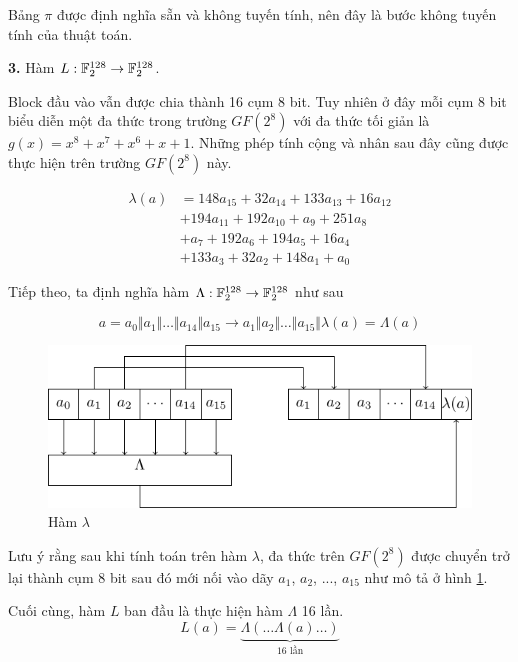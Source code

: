 Bảng $\pi$ được định nghĩa sẵn và không tuyến tính, nên đây là bước
không tuyến tính của thuật toán.

\textbf{3.} Hàm $L: \mathbb{F}_2^{128} \to \mathbb{F}_2^{128}$.

Block đầu vào vẫn được chia thành 16 cụm 8 bit. Tuy nhiên ở
đây mỗi cụm 8 bit biểu diễn một đa thức trong trường $GF(2^8)$
với đa thức tối giản là $g(x) = x^8 + x^7 + x^6 + x + 1$.
Những phép tính cộng và nhân sau đây cũng được thực hiện trên
trường $GF(2^8)$ này.

\begin{equation}
    \label{kuz:3}
    \begin{split}
    \lambda(a) & = 148 a_{15} + 32 a_{14} + 133 a_{13} + 16 a_{12} \\
            & + 194 a_{11} + 192 a_{10} + a_9 + 251 a_8 \\
            & + a_7 + 192 a_6 + 194 a_5 + 16 a_4 \\
            & + 133 a_3 + 32 a_2 + 148 a_1 + a_0
    \end{split}
\end{equation}

Tiếp theo, ta định nghĩa hàm $\Lambda: \mathbb{F}_2^{128} \to \mathbb{F}_2^{128}$
như sau

\begin{equation*}
    a = a_0 \Vert a_1 \Vert \ldots \Vert a_{14} \Vert a_{15}
    \to a_1 \Vert a_2 \Vert \ldots \Vert a_{15} \Vert \lambda(a)
    = \Lambda(a)
\end{equation*}

\begin{figure}
    \centering
    \includegraphics{Kuznyechik/funcLambda.pdf}
    \caption{Hàm $\lambda$}
    \label{kuzfic:1}
\end{figure}

Lưu ý rằng sau khi tính toán trên hàm $\lambda$, đa thức trên
$GF(2^8)$ được chuyển trở lại thành cụm 8 bit sau đó mới
nối vào dãy $a_1$, $a_2$, ..., $a_{15}$ như mô tả ở hình \ref{kuzfic:1}.

Cuối cùng, hàm $L$ ban đầu là thực hiện hàm $\Lambda$ 16 lần.
\[L(a) = \underbrace{\Lambda(\ldots\Lambda(a)\ldots)}_{\text{16 lần}}\]

